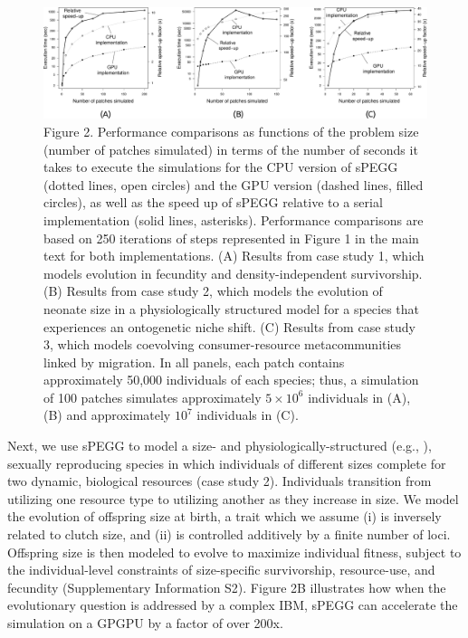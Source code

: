 \documentclass[1p,numbered]{article}
\begin{document}
\begin{linenumbers}
\begin{figure}[h!]
   \centering
   \includegraphics[width=\linewidth] {MainTextFigures/Fig2.pdf}
\caption*{Figure 2. Performance comparisons as functions of the problem size (number of patches simulated) in terms of the number of seconds it takes to execute the simulations for the CPU version of sPEGG (dotted lines, open circles) and the GPU version (dashed lines, filled circles), as well as the speed up of sPEGG relative to a serial implementation (solid lines, asterisks). Performance comparisons are based on 250 iterations of steps represented in Figure 1 in the main text for both implementations. (A) Results from case study 1, which models evolution in fecundity and density-independent survivorship. (B) Results from case study 2, which models the evolution of neonate size in a physiologically structured model for a species that experiences an ontogenetic niche shift. (C) Results from case study 3, which models coevolving consumer-resource metacommunities linked by migration. In all panels, each patch contains approximately 50,000 individuals of each species; thus, a simulation of 100 patches simulates approximately $5\times10^6$ individuals in (A), (B) and approximately $10^7$ individuals in (C).}
\end{figure}

Next, we use sPEGG to model a size- and physiologically-structured (e.g., \citealt{persson98}), sexually reproducing species in which individuals of different sizes complete for two dynamic, biological resources (case study 2). Individuals transition from utilizing one resource type to utilizing another as they increase in size. We model the evolution of offspring size at birth, a trait which we assume (i) is inversely related to clutch size, and (ii) is controlled additively by a finite number of loci. Offspring size is then modeled to evolve to maximize individual fitness, subject to the individual-level constraints of size-specific survivorship, resource-use, and fecundity (Supplementary Information S2). Figure 2B illustrates how when the evolutionary question is addressed by a complex IBM, sPEGG can accelerate the simulation on a GPGPU by a factor of over 200x.


\end{linenumbers}
\end{document}

